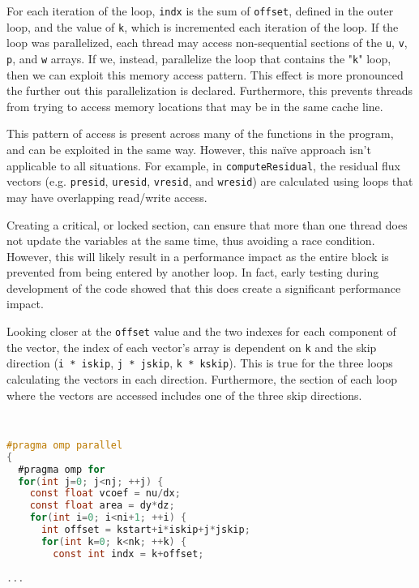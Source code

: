 \documentclass{article}
\begin{document}
  For each iteration of the loop, \verb|indx| is the sum of \verb|offset|,
  defined in the outer loop, and the value of \verb|k|, which is incremented
  each iteration of the loop. If the loop was parallelized, each thread may
  access non-sequential sections of the \verb|u|, \verb|v|, \verb|p|, and
  \verb|w| arrays. If we, instead, parallelize the loop that contains the
  "\verb|k|" loop, then we can exploit this memory access pattern. This effect
  is more pronounced the further out this parallelization is declared.
  Furthermore, this prevents threads from trying to access memory locations
  that may be in the same cache line. 
  
  This pattern of access is present across many of the functions in the 
  program, and can be exploited in the same way. However, this na\"{i}ve 
  approach isn't applicable to all situations. For example, in 
  \verb|computeResidual|, the residual flux vectors (e.g. \verb|presid|, 
  \verb|uresid|, \verb|vresid|, and \verb|wresid|) are calculated using loops
  that may have overlapping read/write access.

  Creating a critical, or locked section, can ensure that more than one thread 
  does not update the variables at the same time, thus avoiding a race 
  condition. However, this will likely result in a performance impact as the 
  entire block is prevented from being entered by another loop. In fact, early 
  testing during development of the code showed that this does create a 
  significant performance impact.

  Looking closer at the \verb|offset| value and the two indexes for each
  component of the vector, the index of each vector's array is dependent on
  \verb|k| and the skip direction (\verb|i * iskip|, \verb|j * jskip|, 
  \verb|k * kskip|). This is true for the three loops calculating the vectors
  in each direction. Furthermore, the section of each loop where the vectors
  are accessed includes one of the three skip directions.

  \begin{lstlisting}[language=C, linewidth=1\textwidth, breaklines=true]
  \end{lstlisting}

  \begin{lstlisting}[language=C, linewidth=1\textwidth, breaklines=true]

#pragma omp parallel
{
  #pragma omp for
  for(int j=0; j<nj; ++j) {
    const float vcoef = nu/dx;
    const float area = dy*dz;
    for(int i=0; i<ni+1; ++i) {
      int offset = kstart+i*iskip+j*jskip;
      for(int k=0; k<nk; ++k) {
        const int indx = k+offset;
    
...

  \end{lstlisting}
\end{document}
